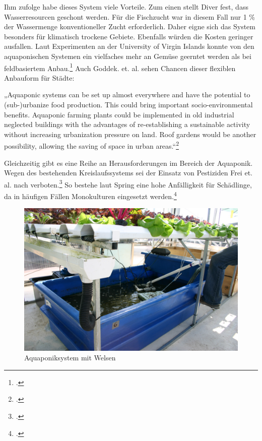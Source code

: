 \documentclass{scrartcl}
\begin{document}
Ihm zufolge habe dieses System viele Vorteile. Zum einen stellt Diver fest, dass Wasserresourcen geschont werden. Für die Fischzucht war in diesem Fall nur 1 \% der Wassermenge konventioneller Zucht erforderlich. Daher eigne sich das System besonders für klimatisch trockene Gebiete. Ebenfalls würden die Kosten geringer ausfallen. Laut Experimenten an der University of Virgin Islands konnte von den aquaponischen Systemen ein vielfaches mehr an Gemüse geerntet werden als bei feldbasiertem Anbau.\footcite[Vgl.][S.7f]{Diver2006Aquaponics-IntegrationAquaculture} Auch Goddek. et. al. sehen Chancen dieser flexiblen Anbauform für Städte:

\begin{displayquote}
„Aquaponic systems can be set up almost everywhere and have the potential to (sub-)urbanize food production. This could bring important socio-environmental benefits. Aquaponic farming plants could be implemented in old industrial neglected buildings with the advantages of re-establishing a sustainable activity without increasing urbanization pressure on land. Roof gardens would be another possibility, allowing the saving of space in urban areas.“\footcites[S.4214]{Goddek2015ChallengesAquaponics}
\end{displayquote}
Gleichzeitig gibt es eine Reihe an Herausforderungen im Bereich der Aquaponik. Wegen des bestehenden Kreislaufssystems sei der Einsatz von Pestiziden Frei et. al. nach verboten.\footcite[S.43]{FreiMatthiasHartmann2007AquaponikGemuse} So bestehe laut Spring eine hohe Anfälligkeit für Schädlinge, da in häufigen Fällen Monokulturen eingesetzt werden.\footcite[S.27]{Spring2012DerBasel-Stadt} 


\begin{figure}[htbp]
\centering

\includegraphics[width=12cm]{image_folder/Aquaponics_with_catfish.jpg}
\caption{Aquaponiksystem mit Welsen}
\label{fig:aquaponik}
\end{figure}
\end{document}
